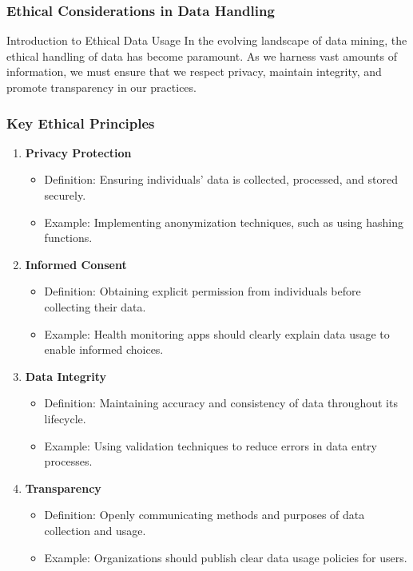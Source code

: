 \documentclass[aspectratio=169]{beamer}
\begin{document}
\begin{frame}[fragile]
    \frametitle{Ethical Considerations in Data Handling}
    \begin{block}{Introduction to Ethical Data Usage}
        In the evolving landscape of data mining, the ethical handling of data has become paramount. As we harness vast amounts of information, we must ensure that we respect privacy, maintain integrity, and promote transparency in our practices.
    \end{block}
\end{frame}

\begin{frame}[fragile]
    \frametitle{Key Ethical Principles}
    \begin{enumerate}
        \item \textbf{Privacy Protection}
            \begin{itemize}
                \item Definition: Ensuring individuals' data is collected, processed, and stored securely.
                \item Example: Implementing anonymization techniques, such as using hashing functions.
            \end{itemize}
        
        \item \textbf{Informed Consent}
            \begin{itemize}
                \item Definition: Obtaining explicit permission from individuals before collecting their data.
                \item Example: Health monitoring apps should clearly explain data usage to enable informed choices.
            \end{itemize}

        \item \textbf{Data Integrity}
            \begin{itemize}
                \item Definition: Maintaining accuracy and consistency of data throughout its lifecycle.
                \item Example: Using validation techniques to reduce errors in data entry processes.
            \end{itemize}

        \item \textbf{Transparency}
            \begin{itemize}
                \item Definition: Openly communicating methods and purposes of data collection and usage.
                \item Example: Organizations should publish clear data usage policies for users.
            \end{itemize}
    \end{enumerate}
\end{frame}
\end{document}

